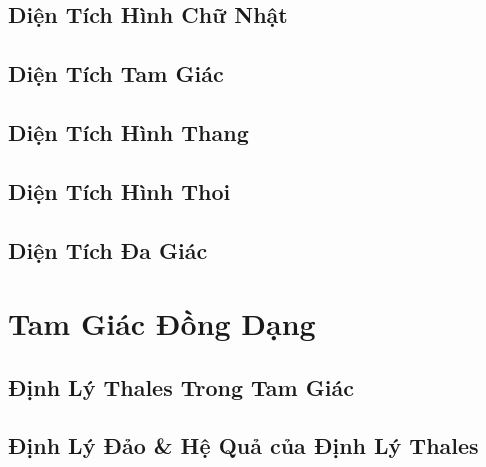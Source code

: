 \documentclass{article}
\numberwithin{equation}{section}
\begin{document}

\subsection{Diện Tích Hình Chữ Nhật}


\subsection{Diện Tích Tam Giác}


\subsection{Diện Tích Hình Thang}


\subsection{Diện Tích Hình Thoi}


\subsection{Diện Tích Đa Giác}


\section{Tam Giác Đồng Dạng}

\subsection{Định Lý Thales Trong Tam Giác}


\subsection{Định Lý Đảo \& Hệ Quả của Định Lý Thales}
\end{document}
